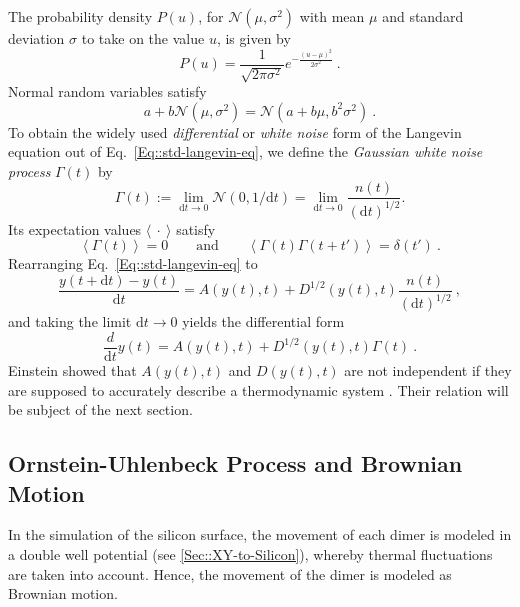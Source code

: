 	The probability density $P(u)$, for $\mathcal{N}(\mu, \sigma^2)$ with mean $\mu$ and standard deviation $\sigma$ to take on the value $u$, is given by
	\begin{equation}
		P(u) =	\frac{1}{\sqrt{2\pi \sigma^2}} e^{-\frac{(u - \mu)^2}{2\sigma^2}} ~.
	\end{equation}
	Normal random variables satisfy
	\begin{equation}
	 	a + b \mathcal{N}(\mu, \sigma^2) =	\mathcal{N}(a + b\mu, b^2\sigma^2)~.
	\end{equation}
	  To obtain the widely used \textit{differential }or \textit{white noise }form of the Langevin equation out of Eq.~\eqref{Eq::std-langevin-eq}, we define the \textit{Gaussian white noise process} $\Gamma(t)$ by
	\begin{equation}
		\Gamma(t) :=	\lim\limits_{\text{d}t \rightarrow 0} \mathcal{N}(0, 1/\text{d}t) = \lim\limits_{\text{d}t \rightarrow 0} \frac{n(t)}{(\text{d}t)^{1/2}}.
	\end{equation}
	Its expectation values $\langle~\cdot~\rangle$ satisfy
	\begin{equation} \label{Eq::Gauss-dist-property}
		\left \langle \Gamma(t) \right \rangle = 0 \qquad \text{and} \qquad  			\left \langle \Gamma(t) \Gamma(t + t')\right \rangle =	\delta(t') ~.
	\end{equation}
	Rearranging Eq.~\eqref{Eq::std-langevin-eq} to
	\begin{equation}
		\frac{y(t + \text{d}t) - y(t)}{\text{d}t} =	A(y(t), t) + D^{1/2} (y(t), t) \frac{n(t)}{(\text{d}t)^{1/2}} ~,
	\end{equation}
	and taking the limit $\text{d}t \rightarrow 0$ yields the differential form
	\begin{equation} \label{Eq::Differential-Langevin-eq}
		\frac{d}{\text{d}t} y(t) =	A(y(t), t) + D^{1/2}(y(t), t) \Gamma(t)~.
	\end{equation}
	Einstein showed that  $A(y(t), t)$ and $D(y(t), t)$ are not independent if they are supposed to accurately describe a thermodynamic system \cite{einstein1905molekularkinetischen}. Their relation will be subject of the next section.
	
	
	\subsection{Ornstein-Uhlenbeck Process and Brownian Motion} \label{Section::Brownian-Motion}
	In the simulation of the silicon surface, the movement of each dimer is modeled in a double well potential (see \autoref{Sec::XY-to-Silicon}), whereby thermal fluctuations are taken into account. Hence, the movement of the dimer is modeled as Brownian motion. 
